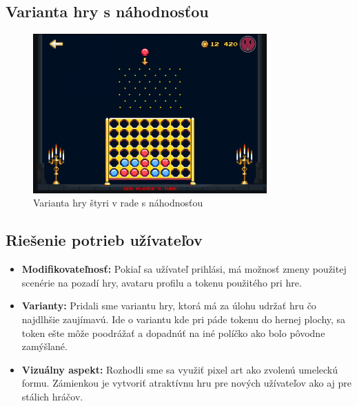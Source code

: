 \documentclass[a4paper, 11pt, onecolumn]{article}
\begin{document}
\subsection*{Varianta hry s náhodnosťou}
\begin{figure}[H]
  \centering
  \includegraphics[width=0.8\textwidth]{RandomVariant.png}
  \caption{Varianta hry štyri v rade s náhodnosťou}
  \label{fig:random_variant}
\end{figure}

\subsection*{Riešenie potrieb užívateľov}
\begin{itemize}
  \item \textbf{Modifikovateľnosť:} Pokiaľ sa užívateľ prihlási, má možnosť zmeny 
               použitej scenérie na pozadí hry, avataru profilu a tokenu použitého pri hre.
  \item \textbf{Varianty:} Pridali sme variantu hry, ktorá má za úlohu udržať hru čo najdlhšie
                zaujímavú. Ide o variantu kde pri páde tokenu do hernej plochy, sa token
                ešte môže poodrážať a dopadnúť na iné políčko ako bolo pôvodne zamýšlané.
  \item \textbf{Vizuálny aspekt:} Rozhodli sme sa využiť pixel art ako zvolenú umeleckú formu.
                Zámienkou je vytvoriť atraktívnu hru pre nových užívateľov ako aj pre stálich hráčov.
\end{itemize}
\end{document}
